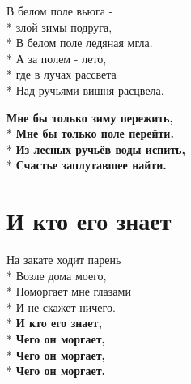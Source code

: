 \medskip

\begin{minipage}{\linewidth}
В белом поле вьюга -\\*
злой зимы подруга,\\*
В белом поле ледяная мгла.\\*
А за полем - лето,\\*
где в лучах рассвета\\*
Над ручьями вишня расцвела.\\
\end{minipage}\par\medskip\nobreak

\medskip

\begin{minipage}{\linewidth}
\hspace*{1.5em}\textbf{Мне бы только зиму пережить,}\\*
\hspace*{1.5em}\textbf{Мне бы только поле перейти.}\\*
\hspace*{1.5em}\textbf{Из лесных ручьёв воды испить,}\\*
\hspace*{1.5em}\textbf{Счастье заплутавшее найти.}\\
\end{minipage}

\vspace{\fill}\newpage

\section{И кто его знает}
\label{song:И_кто_его_знает}

\medskip

\begin{minipage}{\linewidth}
На закате ходит парень\\*
Возле дома моего,\\*
Поморгает мне глазами\\*
И не скажет ничего.\\*
\hspace*{1.5em}\textbf{И кто его знает,}\\*
\hspace*{1.5em}\textbf{Чего он моргает,}\\*
\hspace*{1.5em}\textbf{Чего он моргает,}\\*
\hspace*{1.5em}\textbf{Чего он моргает.}\\
\end{minipage}\par\medskip\nobreak

